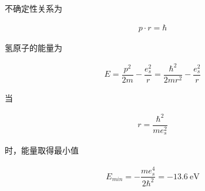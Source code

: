 \documentclass{article}
\newcommand{\si}[1]{\  \mathrm{#1}}
\begin{document}
不确定性关系为

\begin{equation*}
  \begin{aligned}
    p \cdot r = \hbar
  \end{aligned}
\end{equation*}

氢原子的能量为

\begin{equation*}
  \begin{aligned}
    E = \dfrac{p^2}{2m} - \dfrac{e_s^2}{r} = \dfrac{\hbar^2}{2mr^2} - \dfrac{e_s^2}{r}    
  \end{aligned}
\end{equation*}

当

\begin{equation*}
  \begin{aligned}
    r= \dfrac{\hbar^2}{me_s^2} 
  \end{aligned}
\end{equation*}

时，能量取得最小值

\begin{equation*}
  \begin{aligned}
    E_{min} = - \dfrac{me_s^4}{2 \hbar^2} = - 13.6 \si{eV} 
  \end{aligned}
\end{equation*}
\end{document}
